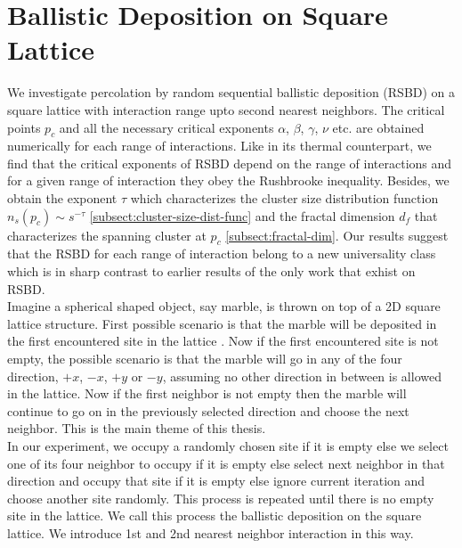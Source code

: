 \chapter{Ballistic Deposition on Square Lattice}

\ifpdf
    \graphicspath{{Chapter5/Figs/}{Chapter5/Figs/L0/}{Chapter5/Figs/L1/}{Chapter5/Figs/L2/}}
\else
    \graphicspath{{Chapter5/Figs/}{Chapter5/Figs/L0/}{Chapter5/Figs/L1/}{Chapter5/Figs/L2/}}
\fi
We investigate percolation by random sequential ballistic deposition (RSBD) on a square lattice with interaction range upto second nearest neighbors. The critical points $p_c$ and all the necessary critical exponents $\alpha$, $\beta$, $\gamma$, $\nu$ etc. are obtained numerically for  each range of interactions. Like  in its thermal counterpart, we find that the critical exponents of RSBD depend on the range of interactions and for a given range of interaction they obey the Rushbrooke inequality. Besides, we obtain the exponent $\tau$ which characterizes the cluster size distribution  function $n_s(p_c)\sim s^{-\tau}$ \ref{subsect:cluster-size-dist-func} and the fractal dimension $d_f$ that characterizes the spanning cluster at $p_c$ \ref{subsect:fractal-dim}. Our results suggest that the RSBD for each range of interaction belong to a new universality class which is in sharp contrast to earlier results of the only work that exhist on RSBD.
\\
Imagine a spherical shaped object, say marble, is thrown on top of a 2D square lattice structure. First possible scenario is that the marble will be deposited in the first encountered site in the lattice . Now if the first encountered site is not empty, the possible scenario is that the marble will go in any of the four direction, $+x$, $-x$, $+y$ or $-y$, assuming no other direction in between is allowed in the lattice.  Now if the first neighbor is not empty then the marble will continue to go on in the previously selected direction and choose the next neighbor. This is the main theme of this thesis.\\
In our experiment, we occupy a randomly chosen site if it is empty else we select one of its four neighbor to occupy if it is empty else select next neighbor in that direction and occupy that site if it is empty else ignore current iteration and choose another site randomly. This process is repeated until there is no empty site in the lattice. We call this process the ballistic deposition on the square lattice. We introduce 1st and 2nd nearest neighbor interaction in this way.
